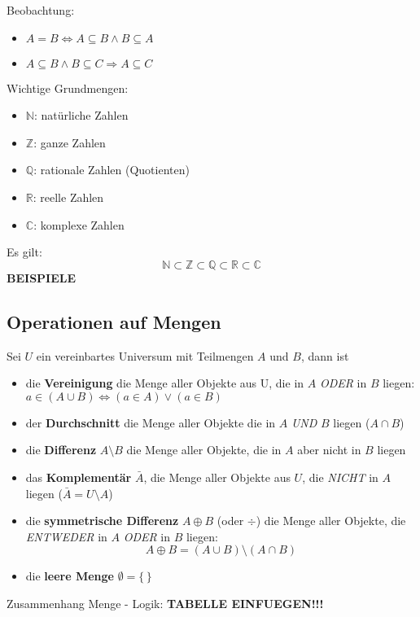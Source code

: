 \documentclass[10pt,a4paper]{article}
\begin{document}
Beobachtung:
\begin{itemize}
\item $A=B \Leftrightarrow A\subseteq B \land B\subseteq A$
\item $A\subseteq B \land B\subseteq C \Rightarrow A\subseteq C$
\end{itemize}

Wichtige Grundmengen:
\begin{itemize}
\item $\mathbb{N}$: natürliche Zahlen
\item $\mathbb{Z}$: ganze Zahlen
\item $\mathbb{Q}$: rationale Zahlen (Quotienten)
\item $\mathbb{R}$: reelle Zahlen
\item $\mathbb{C}$: komplexe Zahlen
\end{itemize}
Es gilt:
\[
\mathbb{N}\subset\mathbb{Z}\subset\mathbb{Q}\subset\mathbb{R}\subset\mathbb{C}
\]
\textbf{BEISPIELE}

\subsection{Operationen auf Mengen}
Sei $U$ ein vereinbartes Universum mit Teilmengen $A$ und $B$, dann ist
\begin{itemize}
\item die \textbf{Vereinigung} die Menge aller Objekte aus U, die in $A$ \emph{ODER} in $B$ liegen:\\
$a\in (A\cup B) \Leftrightarrow (a\in A) \lor (a\in B)$
\item der \textbf{Durchschnitt} die Menge aller Objekte die in $A$ \emph{UND} $B$ liegen ($A\cap B$)
\item die \textbf{Differenz} $A\setminus B$ die Menge aller Objekte, die in $A$ aber nicht in $B$ liegen
\item das \textbf{Komplementär} $\bar{A}$, die Menge aller Objekte aus $U$, die \emph{NICHT} in $A$ liegen ($\bar{A} = U\setminus A$)
\item die \textbf{symmetrische Differenz} $A\oplus B$ (oder $\div$) die Menge aller Objekte, die \emph{ENTWEDER} in $A$ \emph{ODER} in $B$ liegen:
\[
A\oplus B = (A\cup B)\setminus (A\cap B)
\]
\item die \textbf{leere Menge} $\emptyset = \{\,\}$
\end{itemize}

Zusammenhang Menge - Logik:
\textbf{TABELLE EINFUEGEN!!!}
\end{document}

